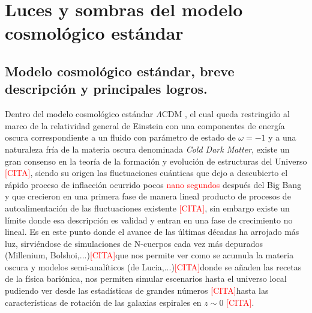 
\chapter{Luces y sombras del modelo cosmológico estándar} %

\label{introduction} %


\newcommand{\keyword}[1]{\textbf{#1}}
\newcommand{\tabhead}[1]{\textbf{#1}}
\newcommand{\code}[1]{\texttt{#1}}
\newcommand{\file}[1]{\texttt{\bfseries#1}}
\newcommand{\option}[1]{\texttt{\itshape#1}}
\newcommand{\lcdm}{$\Lambda$CDM }
\newcommand{\addcite}{\textcolor{red}{[CITA]}}


\section{Modelo cosmológico estándar, breve descripción y principales logros.}
Dentro del modelo cosmológico estándar \lcdm, el cual queda restringido al marco de la relatividad general de Einstein con una componentes de energía oscura correspondiente a un fluido con parámetro de estado de $\omega=-1$ y a una 
naturaleza fría de la materia oscura denominada \textit{Cold Dark Matter}, existe un gran consenso en la teoría de la formación y evolución de estructuras del Universo \addcite, siendo su origen las fluctuaciones cuánticas que dejo a descubierto el rápido proceso de inflacción ocurrido pocos \textcolor{red}{nano segundos} después del Big Bang y que crecieron en una primera fase de manera lineal producto de procesos de autoalimentación de las fluctuaciones existente \addcite, sin embargo existe un límite donde esa descripción es validad y entran en una fase de crecimiento no lineal. Es en este punto donde el avance de las últimas décadas ha arrojado más luz, sirviéndose de simulaciones de N-cuerpos cada vez más depurados (Millenium, Bolshoi,...)\addcite que nos permite ver como se acumula la materia oscura y modelos semi-analíticos (de Lucia,...)\addcite donde se añaden las recetas de la física bariónica, nos permiten simular escenarios hasta el universo local pudiendo ver desde las estadísticas de grandes números \addcite hasta las características de rotación de las galaxias espirales en $z\sim 0$ \addcite.\\

